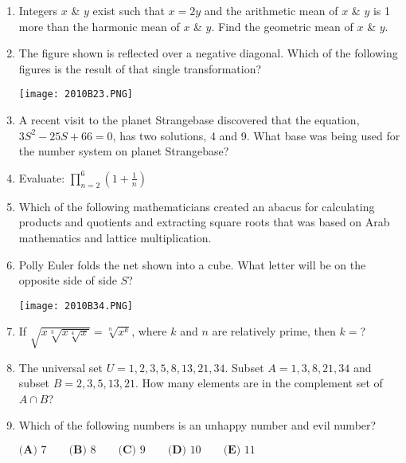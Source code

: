 \documentclass[../uilmath.tex]{subfiles}
\begin{document}
\begin{enumerate}[label=\bfseries\arabic*.]
    \item %
    Integers $x$ \& $y$ exist such that $x=2y$ and the arithmetic mean of $x$ \& $y$ is 1 more than the harmonic mean of $x$ \& $y$. Find the geometric mean of $x$ \& $y$.

    \item %
    The figure shown is reflected over a negative diagonal. Which of the following figures is the result of that single transformation?
    \begin{center}
        \texttt{[image: 2010B23.PNG]}
    \end{center}

    \item %
    A recent visit to the planet Strangebase discovered that the equation, $3S^2-25S+66=0$, has two solutions, 4 and 9. What base was being used for the number system on planet Strangebase?

    \item %
    Evaluate: $\prod_{n=2}^6 (1+\frac{1}{n})$

    \item %
    Which of the following mathematicians created an abacus for calculating products and quotients and extracting square roots that was based on Arab mathematics and lattice multiplication.

    \item %
    Polly Euler folds the net shown into a cube. What letter will be on the opposite side of side $S$?
    \begin{center}
        \texttt{[image: 2010B34.PNG]}
    \end{center}

    \item %
    If $\sqrt{x\sqrt[3]{x\sqrt[4]{x}}}=\sqrt[n]{x^k}$, where $k$ and $n$ are relatively prime, then $k=$?

    \item %
    The universal set $U={1,2,3,5,8,13,21,34}$. Subset $A={1,3,8,21,34}$ and subset $B={2,3,5,13,21}$. How many elements are in the complement set of $A\cap B$?

    \item %
    Which of the following numbers is an unhappy number and evil number?

    $\textbf{(A) } 7 \qquad \textbf{(B) } 8 \qquad \textbf{(C) } 9 \qquad \textbf{(D) } 10 \qquad \textbf{(E) } 11$


\end{enumerate}
\end{document}
